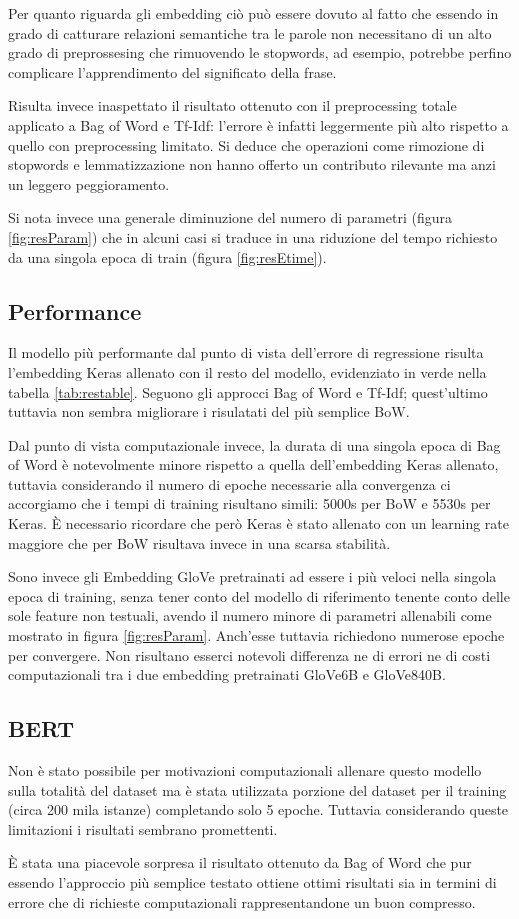 Per quanto riguarda gli embedding ciò può essere dovuto al fatto che essendo in grado di catturare relazioni semantiche tra le parole non
necessitano di un alto grado di preprossesing che rimuovendo le stopwords, ad
esempio, potrebbe perfino complicare l'apprendimento del significato della
frase.

Risulta invece inaspettato il risultato ottenuto con il preprocessing totale
applicato a Bag of Word e Tf-Idf: l'errore è infatti leggermente più alto rispetto
a quello con preprocessing limitato. Si deduce che operazioni come
rimozione di stopwords e lemmatizzazione non hanno offerto un contributo
rilevante ma anzi un leggero peggioramento. 

Si nota invece una generale diminuzione del numero di parametri (figura
\ref{fig:resParam}) che in alcuni casi si traduce in una riduzione del tempo
richiesto da una singola epoca di train (figura \ref{fig:resEtime}).

\subsection{Performance}
Il modello più performante dal punto di vista dell'errore di regressione risulta
l'embedding Keras allenato con il resto del modello, evidenziato in verde nella
tabella \ref{tab:restable}. Seguono gli approcci Bag of Word e Tf-Idf;
quest'ultimo tuttavia non sembra migliorare i risulatati del più semplice BoW.

Dal punto di vista computazionale invece, la durata di una singola epoca di Bag
of Word è notevolmente minore rispetto a quella dell'embedding Keras allenato,
tuttavia considerando il numero di epoche necessarie alla convergenza ci
accorgiamo che i tempi di training risultano simili: 5000s per BoW e 5530s per
Keras. È necessario ricordare che però Keras è stato allenato con un learning
rate maggiore che per BoW risultava invece in una scarsa stabilità.

Sono invece gli Embedding GloVe pretrainati ad essere i più veloci nella singola
epoca di training, senza tener conto del modello di riferimento tenente conto
delle sole feature non testuali, avendo il numero minore di
parametri allenabili come mostrato in figura \ref{fig:resParam}. Anch'esse
tuttavia richiedono numerose epoche per convergere. Non risultano esserci
notevoli differenza ne di errori ne di costi computazionali tra i due embedding
pretrainati GloVe6B e GloVe840B.

\subsection{BERT}

Non è stato possibile per motivazioni computazionali allenare questo
modello sulla totalità del dataset ma è stata utilizzata porzione del
dataset per il training (circa 200 mila istanze) completando solo 5 epoche.
Tuttavia considerando queste limitazioni i risultati sembrano promettenti.

È stata una piacevole sorpresa il risultato ottenuto da Bag of Word che pur
essendo l'approccio più semplice testato ottiene ottimi risultati sia in termini
di errore che di richieste computazionali rappresentandone un buon compresso.